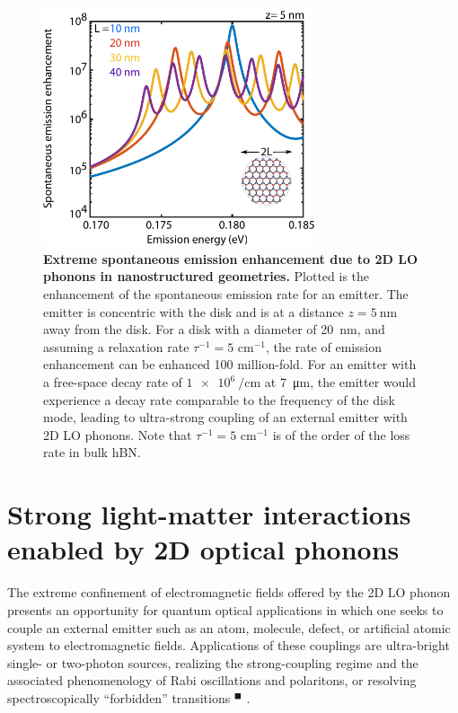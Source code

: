 \documentclass[aps,prb,twocolumn,
	           groupedaddress,superscriptaddress,
               amsfonts,amssymb,amsmath,floatfix,
	           citeautoscript]{revtex4-1}
\newcommand{\comment}[2]{%
    \ifbool{togglecomments}%
    {\textcolor{blue!70!black}{\small\textsf{%
    \textsuperscript{\textsc{\textsf{\MakeLowercase{#1}}}}%
    [#2]}}} %
    {}}     %
\newcommand{\citeremind}[1]{%
	\unskip%
    \textcolor{blue!75!black!80!yellow}{${}^\blacksquare$%
	\ifthenelse{\isempty{#1}}{}{\textsuperscript{\tiny\textsf{#1}}}%
	}\xspace}
\begin{document}
\begin{figure}[t]
    \includegraphics[width=80mm]{fig3.pdf}
    \caption{%
        \textbf{Extreme spontaneous emission enhancement due to 2D LO phonons in nanostructured geometries.} Plotted is the enhancement of the spontaneous emission rate for an emitter. The emitter is concentric with the disk and is at a distance $z=\SI{5}{\nm}$ away from the disk. For a disk with a diameter of \SI{20}{\nm}, and assuming a relaxation rate $\tau^{-1} = 5$ cm$^{-1}$, the rate of emission enhancement can be enhanced \num{100} million-fold. For an emitter with a free-space decay rate of $\SI{1e6}{\per\cm}$ at \SI{7}{\micro\m}, the emitter would experience a decay rate comparable to the frequency of the disk mode, leading to ultra-strong coupling of an external emitter with 2D LO phonons. Note that $\tau^{-1} = 5$ cm$^{-1}$ is of the order of the loss rate in bulk hBN.
        \label{fig:3}
        }
\end{figure}


\section{Strong light-matter interactions enabled by 2D optical phonons}

The extreme confinement of electromagnetic fields offered by the 2D LO phonon presents an opportunity for quantum optical applications in which one seeks to couple an external emitter such as an atom, molecule, defect, or artificial atomic system to electromagnetic fields. Applications of these couplings are ultra-bright single- or two-photon sources, realizing the strong-coupling regime and the associated phenomenology of Rabi oscillations and polaritons, or resolving spectroscopically ``forbidden'' transitions \citeremind{}.
\end{document}
